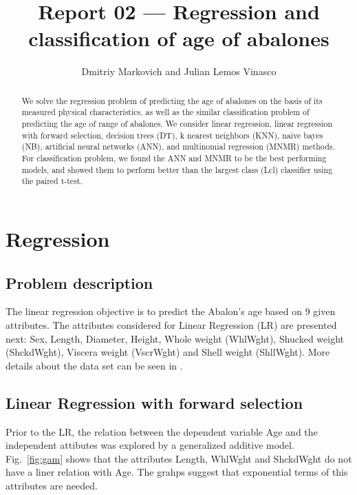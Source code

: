 \documentclass[10pt, paper=a4]{article}
\begin{document}
\title{Report 02 --- Regression and classification of age of abalones}

\author{Dmitriy Markovich and Julian Lemos Vinasco}

\date{}

\maketitle

\begin{abstract}
  We solve the regression problem of predicting the age of abalones on
  the basis of its measured physical characteristics, as well as the
  similar classification problem of predicting the age of range of
  abalones.  We consider linear regression, linear regression with
  forward selection, decision trees (DT), k nearest neighbors (KNN),
  naive bayes (NB), artificial neural networks (ANN), and multinomial
  regression (MNMR) methods.  For classification problem, we found the
  ANN and MNMR to be the best performing models, and showed them to
  perform better than the largest class (Lcl) classifier using the
  paired t-test.
\end{abstract}

\section{Regression}
\label{sec:regression}

\subsection{Problem description}
The linear regression objective is to predict the Abalon's age based
on 9 given attributes. The attributes considered for Linear Regression
(LR) are presented next: Sex, Length, Diameter, Height, Whole weight
(WhlWght), Shucked weight (ShckdWght), Viscera weight (VscrWght) and
Shell weight (ShllWght). More details about the data set can be seen
in \cite{datadescription}.

\subsection{Linear Regression with forward selection}
Prior to the LR, the relation between the dependent variable Age and
the independent attibutes was explored by a generalized additive
model. Fig.~\ref{fig:gam} shows that the attributes Length, WhlWght
and ShckdWght do not have a liner relation with Age. The grahps
suggest that exponential terms of this attributes are needed.
\end{document}
